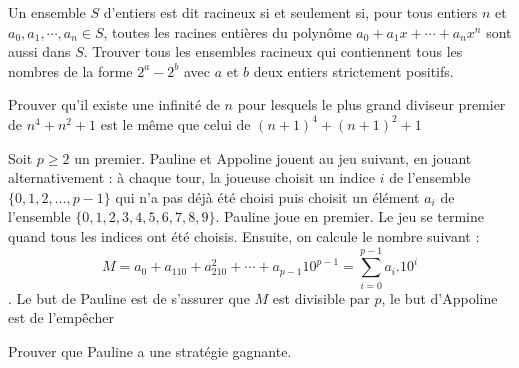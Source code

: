 \begin{exo}%
Un ensemble $S$ d'entiers est dit racineux si et seulement si, pour tous entiers $n$ et $a_0, a_1, \cdots, a_n \in S$, toutes les racines entières du polynôme $a_0 + a_1x + \cdots + a_nx^n$ sont aussi dans $S$. Trouver tous les ensembles racineux qui contiennent tous les nombres de la forme $2^a - 2^b$ avec $a$ et $b$ deux entiers strictement positifs.
\end{exo}


\begin{exo}
Prouver qu'il existe une infinité de $n$ pour lesquels le plus grand diviseur premier de $n^4 + n^2 + 1$ est le même que celui de $(n + 1)^4 + (n + 1)^2 + 1$
\end{exo}


\begin{exo}
Soit $ p \geq 2$ un premier. Pauline et Appoline jouent au jeu suivant, en jouant alternativement : à chaque tour, la joueuse choisit un indice $i$ de l'ensemble $\{0, 1, 2, \ldots, p - 1 \}$ qui n'a pas déjà été choisi puis choisit un élément $a_i$ de l'ensemble $\{0, 1, 2, 3, 4, 5, 6, 7, 8, 9\}$. Pauline joue en premier. Le jeu se termine quand tous les indices ont été choisis. Ensuite, on calcule le nombre suivant :
$$M = a_0 + a_110 + a_210^2 + \cdots + a_{p - 1}10^{p - 1} = \sum_{i = 0}^{p - 1}a_i.10^i$$.
Le but de Pauline est de s'assurer que $M$ est divisible par $p$, le but d'Appoline est de l'empêcher

Prouver que Pauline a une stratégie gagnante.
\end{exo}


